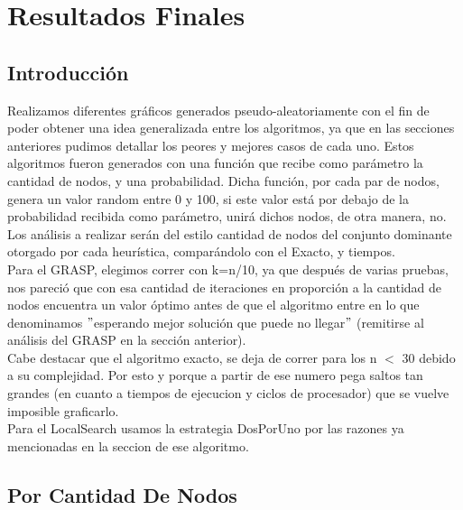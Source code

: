\section{Resultados Finales}

\subsection{Introducción}

Realizamos diferentes gráficos generados pseudo-aleatoriamente con el fin de poder obtener una idea generalizada entre los algoritmos, ya que en las secciones anteriores pudimos
detallar los peores y mejores casos de cada uno. Estos algoritmos fueron generados con una función que recibe como parámetro la cantidad de nodos, y una probabilidad. Dicha función, por cada par de nodos, genera un valor random entre 0 y 100, si este valor está por debajo de la probabilidad recibida como parámetro, unirá dichos nodos, de otra manera, no.\\
Los análisis a realizar serán del estilo cantidad de nodos del conjunto dominante otorgado por cada heurística, comparándolo con el Exacto, y tiempos.\\
Para el GRASP, elegimos correr con k=n/10, ya que después de varias pruebas, nos pareció que con esa cantidad de iteraciones en proporción a la cantidad de nodos encuentra un valor óptimo antes de que el algoritmo entre en lo que denominamos $"$esperando mejor solución que puede no llegar$"$ (remitirse al análisis del GRASP en la sección anterior).\\
Cabe destacar que el algoritmo exacto, se deja de correr para los n $<$ 30 debido a su complejidad. Por esto y porque a partir de ese numero pega saltos tan grandes (en cuanto a tiempos de ejecucion y ciclos de procesador) que se vuelve imposible graficarlo.\\
Para el LocalSearch usamos la estrategia DosPorUno por las razones ya mencionadas en la seccion de ese algoritmo.\\



\subsection{Por Cantidad De Nodos}

